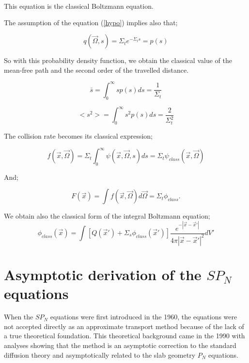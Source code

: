 \documentclass[a4paper, 12pt]{report}
\newcommand{\bl}{\big<}
\newcommand{\bg}{\big>}
\begin{document}
\begin{appendix}
This equation is the classical Boltzmann equation.

The assumption of the equation (\ref{hypo}) implies also that;

\begin{equation}
q(\vec{\Omega},s) = \Sigma_t e^{-\Sigma_t s} = p(s)
\end{equation}

So with this probability density function, we obtain the classical value of the mean-free path and the second order of the travelled distance.

\begin{equation}
\bar{s} = \int_0^\infty s p(s) ds = \frac{1}{\Sigma_t}
\end{equation}

\begin{equation}
\bl s^2 \bg = \int_0^\infty s^2 p(s) ds = \frac{2}{\Sigma_t^2}
\end{equation}

The collision rate becomes its classical expression;

\begin{equation}
f(\vec{x},\vec{\Omega}) = \Sigma_t \int_0^\infty \psi(\vec{x},\vec{\Omega},s)ds = \Sigma_t \psi_{class}(\vec{x},\vec{\Omega})
\end{equation}

And;

\begin{equation}
F(\vec{x}) = \int f(\vec{x},\vec{\Omega}) d\vec{\Omega} = \Sigma_t \phi_{class}.
\end{equation}

We obtain also the classical form of the integral Boltzmann equation;
\begin{equation}
\phi_{class}(\vec{x}) = \int \left[Q(\vec{x}') + \Sigma_s\phi_{class}(\vec{x}') \right] \frac{e^{-|\vec{x}-\vec{x}'|}}{4\pi |\vec{x}-\vec{x}'|^2}dV'
\end{equation}

\chapter{Asymptotic derivation of the $SP_N$ equations}\label{asymptotic}

When the $SP_N$ equations were first introduced in the 1960, the equations were not accepted directly as an approximate transport method because of the lack of a true theoretical foundation.
This theoretical background came in the 1990 with analyses showing that the method is an asymptotic correction to the standard diffusion theory and asymptotically related to the slab geometry $P_N$ equations.


\end{appendix}
\end{document}
